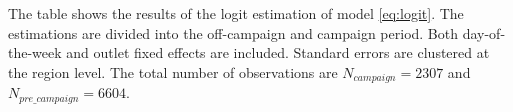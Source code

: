\documentclass[12pt]{article}
\begin{document}
\begin{table}[!htb]
\begin{threeparttable}
				\begin{tablenotes}
				\small
				\item \footnotesize{The table shows the results of the logit estimation of model \ref{eq:logit}. The estimations are divided into the off-campaign and campaign period. Both day-of-the-week and outlet fixed effects are included. Standard errors are clustered at the region level. The total number of observations are $N_{campaign}=2307$ and  $N_{pre\_campaign}=6604$.}
			\end{tablenotes}
		\end{threeparttable}
	\end{table}
	

\end{document}
